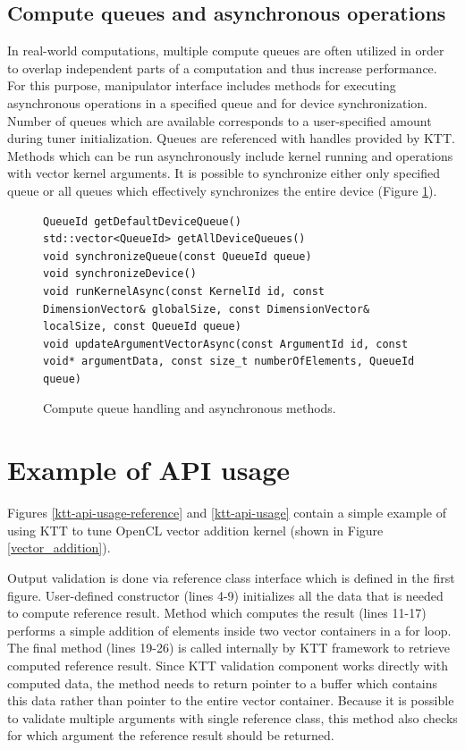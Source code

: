 \documentclass
[
    digital, %
    oneside, %
    table, %
    nolof, %
    nolot, %
    nocover %
]{fithesis3}
\begin{document}
\subsection{Compute queues and asynchronous operations}
In real-world computations, multiple compute queues are often utilized in order to overlap independent parts of a computation and thus increase
performance. For this purpose, manipulator interface includes methods for executing asynchronous operations in a specified queue and for device synchronization.
Number of queues which are available corresponds to a user-specified amount during tuner initialization. Queues are referenced with handles provided by KTT.
Methods which can be run asynchronously include kernel running and operations with vector kernel arguments. It is possible to synchronize either only
specified queue or all queues which effectively synchronizes the entire device (Figure \ref{ktt-manipulator-asynchronous-methods}).

\begin{figure}[ht]
\begin{adjustwidth}{-1cm}{-1cm}
\begin{lstlisting}
QueueId getDefaultDeviceQueue()
std::vector<QueueId> getAllDeviceQueues()
void synchronizeQueue(const QueueId queue)
void synchronizeDevice()
void runKernelAsync(const KernelId id, const DimensionVector& globalSize, const DimensionVector& localSize, const QueueId queue)
void updateArgumentVectorAsync(const ArgumentId id, const void* argumentData, const size_t numberOfElements, QueueId queue)
\end{lstlisting}
\caption{Compute queue handling and asynchronous methods.}
\label{ktt-manipulator-asynchronous-methods}
\end{adjustwidth}
\end{figure}

\section{Example of API usage}
\label{ktt-simple-usage}
Figures \ref{ktt-api-usage-reference} and \ref{ktt-api-usage} contain a simple example of using KTT to tune OpenCL vector addition kernel (shown in
Figure \ref{vector_addition}).

Output validation is done via reference class interface which is defined in the first figure. User-defined constructor (lines 4-9) initializes all
the data that is needed to compute reference result. Method which computes the result (lines 11-17) performs a simple addition of elements inside
two vector containers in a for loop. The final method (lines 19-26) is called internally by KTT framework to retrieve computed reference result.
Since KTT validation component works directly with computed data, the method needs to return pointer to a buffer which contains this data rather than
pointer to the entire vector container. Because it is possible to validate multiple arguments with single reference class, this method also checks
for which argument the reference result should be returned.
\end{document}
